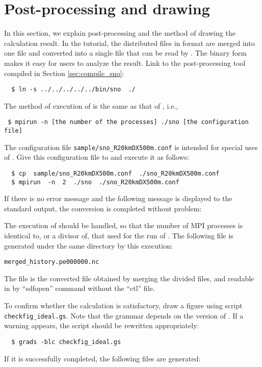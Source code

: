 \section{Post-processing and drawing} \label{sec:ideal_exp_sno}
In this section, we explain post-processing and the method of drawing the calculation result.
In the tutorial, the distributed files in \netcdf format are merged into one file
and converted into a single \netcdf file that can be read by {\grads}.
The binary form makes it easy for users to analyze the result.
Link to the post-processing tool \sno compiled in Section \ref{sec:compile_sno}:
\begin{verbatim}
  $ ln -s ../../../../../bin/sno  ./
\end{verbatim}

The method of execution of \sno is the same as that of \scalerm, i.e.,
\begin{verbatim}
 $ mpirun -n [the number of the processes] ./sno [the configuration file]
\end{verbatim}
The configuration file \verb|sample/sno_R20kmDX500m.conf| is intended for special uses of \sno.
Give this configuration file to \sno and execute it as follows:
\begin{verbatim}
  $ cp  sample/sno_R20kmDX500m.conf  ./sno_R20kmDX500m.conf
  $ mpirun  -n  2  ./sno  ./sno_R20kmDX500m.conf
\end{verbatim}
If there is no error message and the following message is displayed to the standard output,
the conversion is completed without problem:

The execution of \sno should be handled,
so that the number of MPI processes is identical to, or a divisor of, that used for the run of \scalerm.
The following file is generated under the same directory by this execution:
\begin{alltt}
  merged_history.pe000000.nc
\end{alltt}
The \netcdf file is the converted file obtained by merging the divided files,
and readable in \grads by ``sdfopen'' command without the ``ctl'' file.

To confirm whether the calculation is satisfactory,
draw a figure using \grads script \verb|checkfig_ideal.gs|.
Note that the grammar depends on the version of \grads.
If a warning appears, the \grads script should be rewritten appropriately:
\begin{verbatim}
  $ grads -blc checkfig_ideal.gs
\end{verbatim}
If it is successfully completed, the following files are generated:


